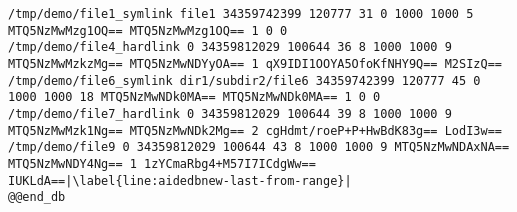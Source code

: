 \documentclass[thesis]{subfiles}
\begin{document}
\begin{appendices}
\begin{minipage}{\linewidth}
\begin{lstlisting}
/tmp/demo/file1_symlink file1 34359742399 120777 31 0 1000 1000 5 MTQ5NzMwMzg1OQ== MTQ5NzMwMzg1OQ== 1 0 0
/tmp/demo/file4_hardlink 0 34359812029 100644 36 8 1000 1000 9 MTQ5NzMwMzkzMg== MTQ5NzMwNDYyOA== 1 qX9IDI1OOYA5OfoKfNHY9Q== M2SIzQ==
/tmp/demo/file6_symlink dir1/subdir2/file6 34359742399 120777 45 0 1000 1000 18 MTQ5NzMwNDk0MA== MTQ5NzMwNDk0MA== 1 0 0
/tmp/demo/file7_hardlink 0 34359812029 100644 39 8 1000 1000 9 MTQ5NzMwMzk1Ng== MTQ5NzMwNDk2Mg== 2 cgHdmt/roeP+P+HwBdK83g== LodI3w==
/tmp/demo/file9 0 34359812029 100644 43 8 1000 1000 9 MTQ5NzMwNDAxNA== MTQ5NzMwNDY4Ng== 1 1zYCmaRbg4+M57I7ICdgWw== IUKLdA==|\label{line:aidedbnew-last-from-range}|
@@end_db
\end{lstlisting}
\end{minipage}
%
%


\end{appendices}
\end{document}
